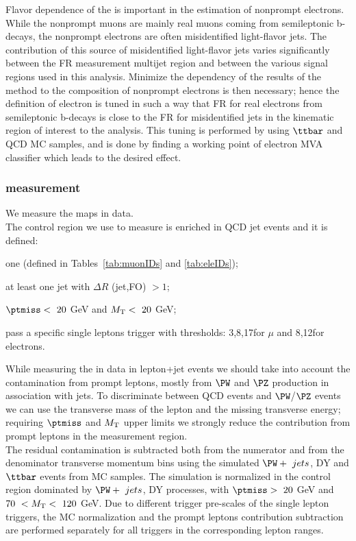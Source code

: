 Flavor dependence of the \fr is important in the estimation of
nonprompt electrons. While the nonprompt muons are mainly real muons
coming from semileptonic b-decays, the nonprompt electrons are often
misidentified light-flavor jets. The contribution of this source of misidentified light-flavor jets varies significantly between 
the FR measurement multijet region and between the various signal
regions used in this analysis. Minimize the
dependency of the results of the method to the composition of
nonprompt electrons is then necessary; hence the definition
of \fo electron is tuned in such a way that FR for real electrons from semileptonic b-decays
is close to the FR for misidentified jets in the kinematic region of interest to the analysis. 
This tuning is performed by using $\ttbar$ and QCD MC samples, and is
done by finding a working point of 
electron MVA classifier which leads to the desired effect. 

\subsubsection{\fr measurement} \label{sec:singleFR}
We measure the \fr maps in data.\\
The control region we use to measure is enriched in QCD jet events and
it is defined:
\begin{itemize}
\setlength\itemsep{-0.2em}
  {\footnotesize
	\item one \fo (defined in Tables~\ref{tab:muonIDs} and \ref{tab:eleIDs});
	\item at least one jet with $\Delta R$ (jet,FO) $>1$;
	\item $\ptmiss < \ 20$ GeV and $M_{\mathrm{T}} < \ 20 $ GeV;
	\item pass a specific single leptons trigger with \pt thresholds:
          3,8,17\GeV for $\mu$ and 8,12\GeV for electrons.}
\end{itemize}
While measuring the \fr in data in lepton+jet events we should take into account the contamination from prompt leptons, mostly from $\PW$ and $\PZ$ production in association with jets.
 To discriminate between QCD events and $\PW$/$\PZ$ events we can use the transverse mass of the lepton and the missing transverse energy; requiring $\ptmiss$ and $M_{\mathrm{T}}$ upper limits we strongly reduce
  the contribution from prompt leptons in the measurement region. \\
The residual contamination is subtracted both from the numerator and from the denominator transverse momentum bins using the simulated $\PW + \ jets$, DY and $\ttbar$ events from MC samples. The simulation is normalized in the control region dominated by $\PW + \ jets$, DY processes, with $\ptmiss > \ 20$ GeV and $70 \ < M_{\mathrm{T}} < \ 120 $ GeV.
Due to different trigger pre-scales of the single lepton triggers, the
MC normalization and the prompt leptons contribution subtraction are
performed separately for all triggers in the corresponding lepton \pt ranges.



